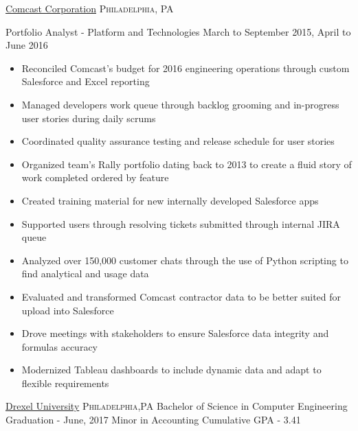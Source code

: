 \documentclass[10pt,letterpaper]{article}
\begin{document}
\headedsection
  {\href{http://corporate.comcast.com/}{Comcast Corporation}}
  {\textsc{Philadelphia, PA}} {%
  \headedsubsection
    {Portfolio Analyst - Platform and Technologies}
    {March to September 2015, April to June 2016}
    {\begin{itemize}
    \item Reconciled Comcast's budget for 2016 engineering operations through custom Salesforce and Excel reporting
    \item Managed developers work queue through backlog grooming and in-progress user stories during daily scrums
    \item Coordinated quality assurance testing and release schedule for user stories
    \item Organized team's Rally portfolio dating back to 2013 to create a fluid story of work completed ordered by feature
    \item Created training material for new internally developed Salesforce apps
    \item Supported users through resolving tickets submitted through internal JIRA queue
    \item Analyzed over 150,000 customer chats through the use of Python scripting to find analytical and usage data
    \item Evaluated and transformed Comcast contractor data to be better suited for upload into Salesforce
    \item Drove meetings with stakeholders to ensure Salesforce data integrity and formulas accuracy
    \item Modernized Tableau dashboards to include dynamic data and adapt to flexible requirements
    \end{itemize}}
}

\spacedhrule{0.9em}{-0.4em}


\headedsection
  {\href{http://www.drexel.edu/}{Drexel University}}
  {\textsc{Philadelphia,PA}} {%
  \headedsubsectiontwo
    {Bachelor of Science in Computer Engineering}
    {Graduation - June, 2017}
    {Minor in Accounting}
    {Cumulative GPA - 3.41}
}
\end{document}
